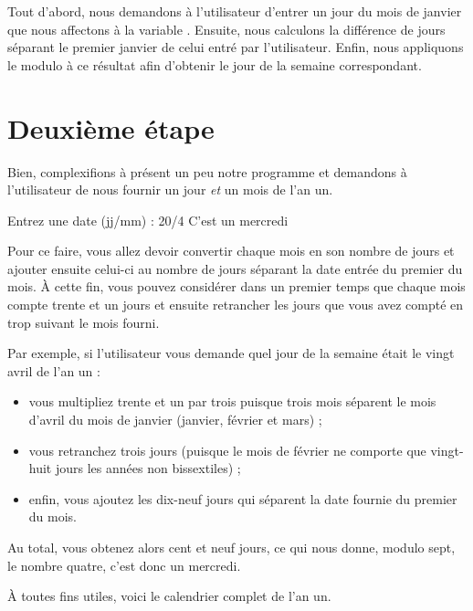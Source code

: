 Tout d'abord, nous demandons à l'utilisateur d'entrer un jour du mois de
janvier que nous affectons à la variable . Ensuite, nous
calculons la différence de jours séparant le premier janvier de celui
entré par l'utilisateur. Enfin, nous appliquons le modulo à ce résultat
afin d'obtenir le jour de la semaine correspondant.

\section{Deuxième étape}
\label{deuxieme-etape }

Bien, complexifions à présent un peu notre programme
et demandons à l'utilisateur de nous fournir un jour \emph{et} un mois
de l'an un.

\begin{C}
Entrez une date (jj/mm) : 20/4
C'est un mercredi
\end{C}

Pour ce faire, vous allez devoir convertir chaque mois en son nombre de
jours et ajouter ensuite celui-ci au nombre de jours séparant la date
entrée du premier du mois. À cette fin, vous pouvez considérer dans un
premier temps que chaque mois compte trente et un jours et ensuite
retrancher les jours que vous avez compté en trop suivant le mois
fourni.

Par exemple, si l'utilisateur vous demande quel jour de la semaine était
le vingt avril de l'an un :

\begin{itemize}
\item
  vous multipliez trente et un par trois puisque trois mois séparent le
  mois d'avril du mois de janvier (janvier, février et mars) ;
\item
  vous retranchez trois jours (puisque le mois de février ne comporte
  que vingt-huit jours les années non bissextiles) ;
\item
  enfin, vous ajoutez les dix-neuf jours qui séparent la date fournie du
  premier du mois.
\end{itemize}

Au total, vous obtenez alors cent et neuf jours, ce qui nous donne,
modulo sept, le nombre quatre, c'est donc un mercredi.

À toutes fins utiles, voici le calendrier complet de l'an un.

